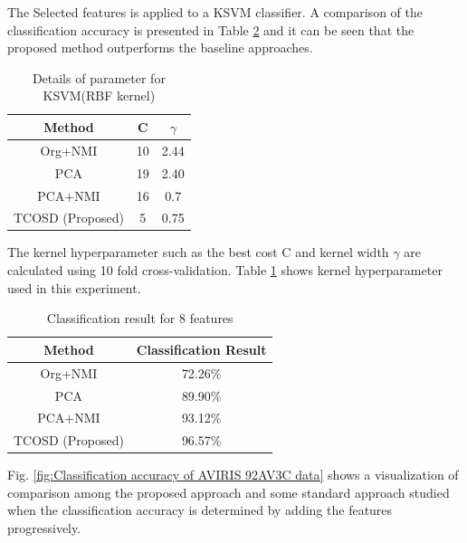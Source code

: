 \documentclass[document.tex]{subfiles}
\begin{document}
\noindent The Selected features is applied to a KSVM classifier. A comparison of the classification accuracy is presented in Table \ref{tab:Classification result for 8 features} and it can be seen that the proposed method outperforms the baseline approaches.
\begin{table}[H]
	\caption{Details of parameter for KSVM(RBF kernel)}
	\begin{center}
		\begin{tabular}{|c|c|c|}
			\hline
			Method & C & $\gamma$ \\ \hline
			Org+NMI & 10 & 2.44 \\ \hline
			PCA & 19 & 2.40 \\ \hline
			PCA+NMI & 16 & 0.7\\ \hline
			TCOSD (Proposed) & 5 & 0.75\\ \hline
		\end{tabular}
	\end{center}
	\label{tab:Details of parameter for KSVM(RBF kernel)}
\end{table}
\noindent The kernel hyperparameter such as the best cost C and kernel width $\gamma$ are calculated using 10 fold cross-validation\cite{29}. Table \ref{tab:Details of parameter for KSVM(RBF kernel)} shows kernel hyperparameter used in this experiment.
\begin{table}[H]
	\caption{Classification result for 8 features}
	\begin{center}
		\begin{tabular}{|c|c|}
			\hline
			Method & Classification Result\\ \hline
			Org+NMI & 72.26\%\\ \hline
			PCA & 89.90\%\\ \hline
			PCA+NMI & 93.12\%\\ \hline
			TCOSD (Proposed)& 96.57\%\\ \hline
		\end{tabular}
	\end{center}
	\label{tab:Classification result for 8 features}
\end{table}
\noindent Fig. \ref{fig:Classification accuracy of AVIRIS 92AV3C data} shows a visualization of comparison among the proposed approach and some standard approach studied when the classification accuracy is determined by adding the features progressively.\\
\end{document}
